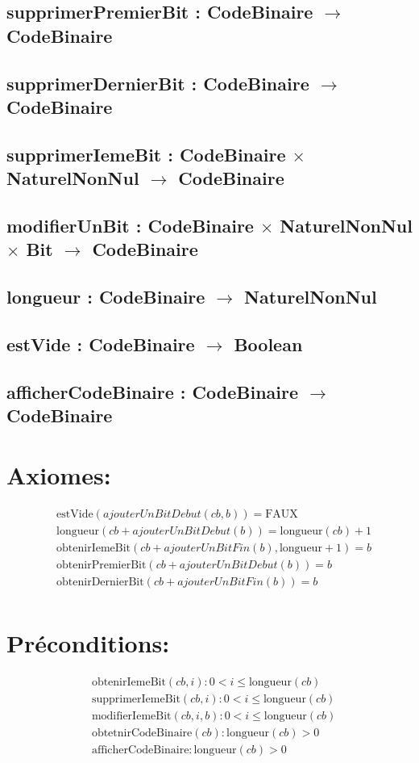 \documentclass{article}
\begin{document}
\subsection*{supprimerPremierBit : CodeBinaire $\to$ CodeBinaire}
\subsection*{supprimerDernierBit : CodeBinaire $\to$ CodeBinaire}
\subsection*{supprimerIemeBit : CodeBinaire $\times$ NaturelNonNul $\to$ CodeBinaire}
\subsection*{modifierUnBit : CodeBinaire $\times$ NaturelNonNul $\times$ Bit $\to$ CodeBinaire}
\subsection*{longueur : CodeBinaire $\to$ NaturelNonNul}
\subsection*{estVide : CodeBinaire $\to$ Boolean}
\subsection*{afficherCodeBinaire : CodeBinaire $\to$ CodeBinaire}

\section*{Axiomes:}
\begin{align*}
&\text{estVide}(ajouterUnBitDebut(cb, b)) = \text{FAUX} \\
&\text{longueur}(cb + ajouterUnBitDebut(b)) = \text{longueur}(cb) + 1 \\
&\text{obtenirIemeBit}(cb + ajouterUnBitFin(b), \text{longueur} + 1) = b \\
&\text{obtenirPremierBit}(cb + ajouterUnBitDebut(b)) = b \\
&\text{obtenirDernierBit}(cb + ajouterUnBitFin(b)) = b \\
\end{align*}

\section*{Préconditions:}
\begin{align*}
&\text{obtenirIemeBit}(cb, i) : 0 < i \leq \text{longueur}(cb) \\
&\text{supprimerIemeBit}(cb, i) : 0 < i \leq \text{longueur}(cb) \\
&\text{modifierIemeBit}(cb, i, b) : 0 < i \leq \text{longueur}(cb) \\
&\text{obtetnirCodeBinaire}(cb) : \text{longueur}(cb) > 0 \\
&\text{afficherCodeBinaire} : \text{longueur}(cb) > 0
\end{align*}
\end{document}
